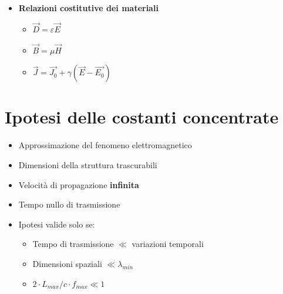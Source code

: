 \begin{itemize}
    \item \textbf{Relazioni costitutive dei materiali}
    \begin{itemize}
        \item \(\vec{D} = \varepsilon \vec{E} \)
        \item \(\vec{B} = \mu \vec{H} \)
        \item \(\vec{J} = \vec{J_0}+\gamma(\vec{E}-\vec{E_0}) \)
    \end{itemize}
\end{itemize}

\section*{Ipotesi delle costanti concentrate}
\begin{itemize}
    \item Approssimazione del fenomeno elettromagnetico
    \item Dimensioni della struttura trascurabili
    \item Velocit\`a di propagazione \textbf{infinita}
    \item Tempo nullo di trasmissione
    \item Ipotesi valide solo se:
    \begin{itemize}
        \item Tempo di trasmissione \( \ll \) variazioni temporali
        \item Dimensioni spaziali \( \ll \lambda_{min} \)
        \item \( 2 \cdot L_{max} / c \cdot f_{max} \ll 1 \)
    \end{itemize}
\end{itemize}

